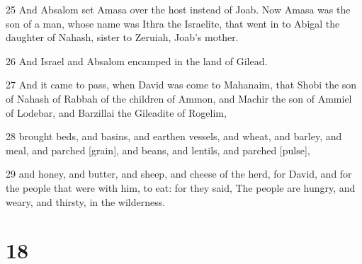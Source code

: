 \par 25 And Absalom set Amasa over the host instead of Joab. Now Amasa was the son of a man, whose name was Ithra the Israelite, that went in to Abigal the daughter of Nahash, sister to Zeruiah, Joab's mother.
\par 26 And Israel and Absalom encamped in the land of Gilead.
\par 27 And it came to pass, when David was come to Mahanaim, that Shobi the son of Nahash of Rabbah of the children of Ammon, and Machir the son of Ammiel of Lodebar, and Barzillai the Gileadite of Rogelim,
\par 28 brought beds, and basins, and earthen vessels, and wheat, and barley, and meal, and parched [grain], and beans, and lentils, and parched [pulse],
\par 29 and honey, and butter, and sheep, and cheese of the herd, for David, and for the people that were with him, to eat: for they said, The people are hungry, and weary, and thirsty, in the wilderness.

\chapter{18}

